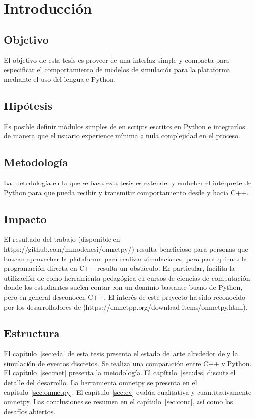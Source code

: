 \chapter{Introducción}
\section{Objetivo}

El objetivo de esta tesis es proveer de una interfaz simple y compacta para
especificar el comportamiento de modelos de simulación para la plataforma
\omnetpp{} mediante el uso del lenguaje Python.

\section{Hipótesis}

Es posible definir módulos simples de \omnetpp{} en scripts escritos en Python e
integrarlos de manera que el usuario experience mínima o nula complejidad en el
proceso.

\section{Metodología}

La metodología en la que se basa esta tesis es extender y embeber el intérprete
de Python para que pueda recibir y transmitir comportamiento desde y hacia C++.

\section{Impacto}

El resultado del trabajo (disponible en https://github.com/mmodenesi/omnetpy/)
resulta beneficioso para personas que buscan aprovechar la plataforma \omnetpp{}
para realizar simulaciones, pero para quienes la programación directa en C++
resulta un obstáculo. En particular, facilita la utilización de \omnetpp{} como
herramienta pedagógica en cursos de ciencias de computación donde los
estudiantes suelen contar con un dominio bastante bueno de Python, pero en
general desconocen C++.  El interés de este proyecto ha sido reconocido por los
desarrolladores de \omnetpp{} (https://omnetpp.org/download-items/omnetpy.html).

\section{Estructura}

El capítulo~\ref{sec:eda} de esta tesis presenta el estado del arte alrededor
de \omnetpp{} y la simulación de eventos discretos. Se realiza una comparación
entre C++ y Python. El capítulo~\ref{sec:met} presenta la metodología. El
capítulo~\ref{sec:des} discute el detalle del desarrollo. La herramienta
omnetpy se presenta en el capítulo~\ref{sec:omnetpy}. El capítulo~\ref{sec:ev}
evalúa cualitativa y cuantitativamente omnetpy. Las conclusiones se resumen en
el capítulo~\ref{sec:conc}, así como los desafíos abiertos.
